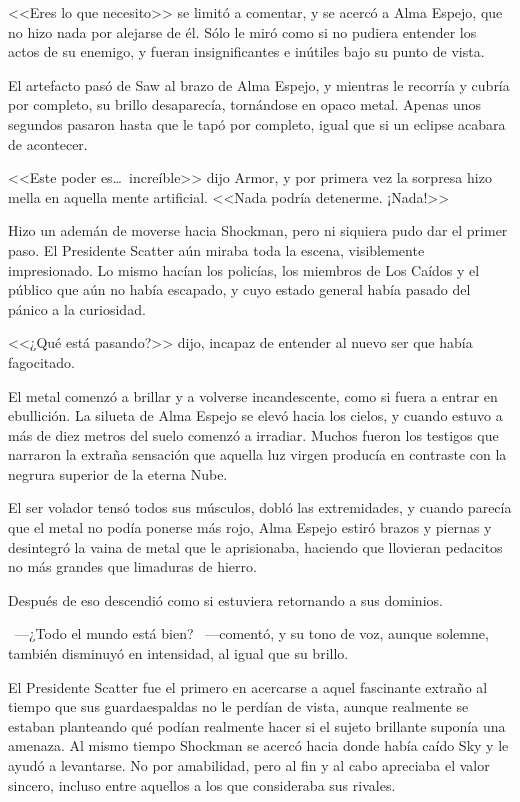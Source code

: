 <<Eres lo que necesito>> se limitó a comentar, y se acercó a Alma Espejo, que no hizo nada por alejarse de él. Sólo le miró como si no pudiera entender los actos de su enemigo, y fueran insignificantes e inútiles bajo su punto de vista.

El artefacto pasó de Saw al brazo de Alma Espejo, y mientras le recorría y cubría por completo, su brillo desaparecía, tornándose en opaco metal. Apenas unos segundos pasaron hasta que le tapó por completo, igual que si un eclipse acabara de acontecer.

<<Este poder es\dots\ increíble>> dijo Armor, y por primera vez la sorpresa hizo mella en aquella mente artificial. <<Nada podría detenerme. ¡Nada!>>

Hizo un ademán de moverse hacia Shockman, pero ni siquiera pudo dar el primer paso. El Presidente Scatter aún miraba toda la escena, visiblemente impresionado. Lo mismo hacían los policías, los miembros de Los Caídos y el público que aún no había escapado, y cuyo estado general había pasado del pánico a la curiosidad.

<<¿Qué está pasando?>> dijo, incapaz de entender al nuevo ser que había fagocitado.

El metal comenzó a brillar y a volverse incandescente, como si fuera a entrar en ebullición. La silueta de Alma Espejo se elevó hacia los cielos, y cuando estuvo a más de diez metros del suelo comenzó a irradiar. Muchos fueron los testigos que narraron la extraña sensación que aquella luz virgen producía en contraste con la negrura superior de la eterna Nube.

El ser volador tensó todos sus músculos, dobló las extremidades, y cuando parecía que el metal no podía ponerse más rojo, Alma Espejo estiró brazos y piernas y desintegró la vaina de metal que le aprisionaba, haciendo que llovieran pedacitos no más grandes que limaduras de hierro.

Después de eso descendió como si estuviera retornando a sus dominios.

~---¿Todo el mundo está bien? ~---comentó, y su tono de voz, aunque solemne, también disminuyó en intensidad, al igual que su brillo.

El Presidente Scatter fue el primero en acercarse a aquel fascinante extraño al tiempo que sus guardaespaldas no le perdían de vista, aunque realmente se estaban planteando qué podían realmente hacer si el sujeto brillante suponía una amenaza. Al mismo tiempo Shockman se acercó hacia donde había caído Sky y le ayudó a levantarse. No por amabilidad, pero al fin y al cabo apreciaba el valor sincero, incluso entre aquellos a los que consideraba sus rivales.

